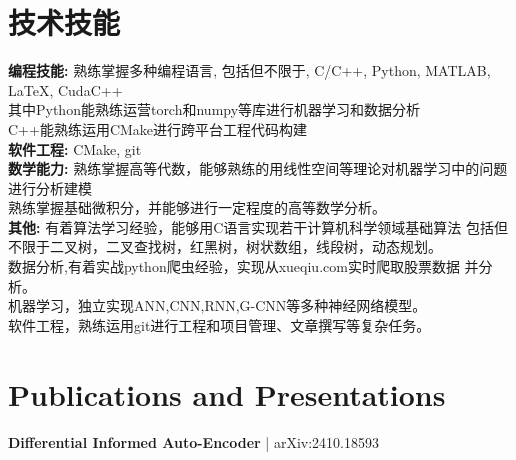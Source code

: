 \documentclass[a4paper,10pt]{article}
\begin{document}
\section*{技术技能}
\textbf{编程技能:} 熟练掌握多种编程语言, 包括但不限于, C/C++, Python, MATLAB, LaTeX, CudaC++  \\
其中Python能熟练运营torch和numpy等库进行机器学习和数据分析 \\
C++能熟练运用CMake进行跨平台工程代码构建 \\
\textbf{软件工程:} CMake, git \\
\textbf{数学能力:} 熟练掌握高等代数，能够熟练的用线性空间等理论对机器学习中的问题进行分析建模 \\
熟练掌握基础微积分，并能够进行一定程度的高等数学分析。\\
\textbf{其他:} 有着算法学习经验，能够用C语言实现若干计算机科学领域基础算法
包括但不限于二叉树，二叉查找树，红黑树，树状数组，线段树，动态规划。\\
数据分析,有着实战python爬虫经验，实现从xueqiu.com实时爬取股票数据
并分析。\\
机器学习，独立实现ANN,CNN,RNN,G-CNN等多种神经网络模型。\\
软件工程，熟练运用git进行工程和项目管理、文章撰写等复杂任务。


\section*{Publications and Presentations}
\textbf{Differential Informed Auto-Encoder} | arXiv:2410.18593  \\



\end{document}
